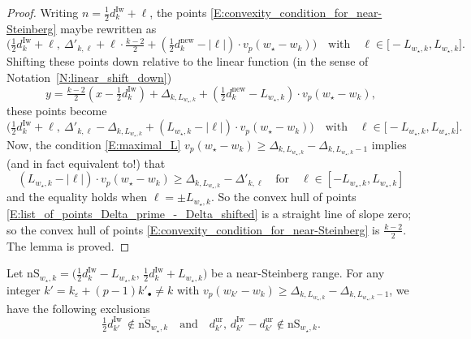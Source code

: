 \begin{proof}
    Writing $n = \frac 12 d_k^{\mathrm{Iw}}+ \ell$, the points \eqref{E:convexity_condition_for_near-Steinberg} maybe rewritten as
    $$
    \big( \tfrac 12 d_k^{\mathrm{Iw}}+ \ell, \ \Delta'_{k, \ell} + \ell \cdot \tfrac{k-2}2 + (\tfrac 12d_k^{\mathrm{new}}- |\ell|) \cdot v_p(w_\star-w_k) \big) \quad \textrm{with} \quad \ell \in \big[  - L_{w_\star, k}, L_{w_\star, k}].
    $$
    Shifting these points down relative to the linear function (in the sense of Notation~\ref{N:linear_shift_down}) $$y =\tfrac {k-2}2 (x-\tfrac 12d_k^{\mathrm{Iw}})+ \Delta_{k, L_{w_\star, k}} + (\tfrac 12d_k^{\mathrm{new}}- L_{w_\star, k})\cdot v_p(w_\star-w_k),$$ these points become
    \begin{equation}
    \label{E:list_of_points_Delta_prime_-_Delta_shifted}
    \big( \tfrac 12 d_k^{\mathrm{Iw}}+ \ell, \ \Delta'_{k, \ell} -\Delta_{k, L_{w_\star, k}} + (L_{w_\star,k} - |\ell|) \cdot v_p(w_\star-w_k) \big) \quad \textrm{with} \quad \ell \in \big[  - L_{w_\star, k}, L_{w_\star, k}].
    \end{equation}
    Now, the condition \eqref{E:maximal_L} $v_p(w_\star -w_k) \geq \Delta_{k, L_{w_\star,k}} - \Delta_{k, L_{w_\star,k}-1}$ implies (and in fact equivalent to!) that
    $$
    (L_{w_\star,k} - |\ell|) \cdot v_p(w_\star -w_k) \geq \Delta_{k, L_{w_\star, k}}-\Delta'_{k,\ell} \quad \textrm{for} \quad \ell \in [-L_{w_\star, k}, L_{w_\star, k}]
    $$
    and the equality holds when $\ell = \pm L_{w_\star, k}$. So the convex hull of points \eqref{E:list_of_points_Delta_prime_-_Delta_shifted} is a straight line of slope zero; so the convex hull of points \eqref{E:convexity_condition_for_near-Steinberg} is $\frac{k-2}2$. The lemma is proved.
\end{proof}

\begin{proposition}
    \label{P:shifting_points_wstar_to_wk_part1}
    Let $ {\mathrm{nS}}_{w_\star, k} = \big(\tfrac 12 d_{k}^{\mathrm{Iw}}- L_{w_\star, k},\, \tfrac 12 d_{k}^{\mathrm{Iw}}+ L_{ w_\star, k} \big)$ be a  near-Steinberg range.  For any integer $k' = k_\varepsilon + (p-1)k'_\bullet \neq k $ with
    $v_p(w_{k'}-w_k) \geq  \Delta_{k, L_{ w_\star, k}} - \Delta_{k, L_{ w_\star, k}-1}$,  we have the following exclusions
    $$ \tfrac 12 d_{k'}^{\mathrm{Iw}}\, \notin \overline{\mathrm{nS}}_{w_\star, k} \quad \textrm{and} \quad
    d_{k'}^{\mathrm{ur}},\, d_{k'}^{\mathrm{Iw}}- d_{k'}^{\mathrm{ur}}\notin {\mathrm{nS}}_{w_\star, k}.
    $$
\end{proposition}

